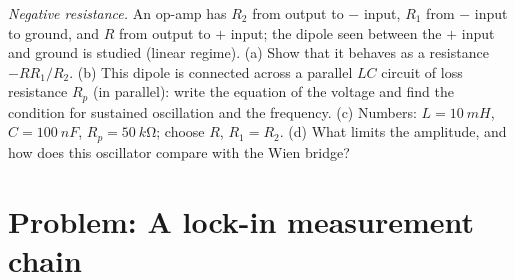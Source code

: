 \begin{exercise}[$\star\star\star$]\label{exo:b2:feedback-oscillators:12}
\emph{Negative resistance.} An op-amp has $R_2$ from output to $-$
input, $R_1$ from $-$ input to ground, and $R$ from output to $+$ input;
the dipole seen between the $+$ input and ground is studied (linear
regime). (a) Show that it behaves as a resistance $-RR_1/R_2$. (b) This
dipole is connected across a parallel $LC$ circuit of loss resistance
$R_p$ (in parallel): write the equation of the voltage and find the
condition for sustained oscillation and the frequency. (c) Numbers: $L
= \qty{10}{mH}$, $C = \qty{100}{nF}$, $R_p = \qty{50}{k\ohm}$; choose $R$, $R_1 =
R_2$. (d) What limits the amplitude, and how does this oscillator
compare with the Wien bridge?
\end{exercise}

\section{Problem: A lock-in measurement chain}

